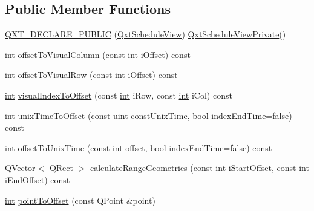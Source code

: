 \subsection*{Public Member Functions}
\begin{DoxyCompactItemize}
\item 
\hyperlink{class_qxt_schedule_view_private_a4fc125cd42cc324eb4a471220a1c36fd}{Q\-X\-T\-\_\-\-D\-E\-C\-L\-A\-R\-E\-\_\-\-P\-U\-B\-L\-I\-C} (\hyperlink{class_qxt_schedule_view}{Qxt\-Schedule\-View}) \hyperlink{class_qxt_schedule_view_private}{Qxt\-Schedule\-View\-Private}()
\item 
\hyperlink{ioapi_8h_a787fa3cf048117ba7123753c1e74fcd6}{int} \hyperlink{class_qxt_schedule_view_private_a1546317491227d0bb70fdc7289caa92f}{offset\-To\-Visual\-Column} (const \hyperlink{ioapi_8h_a787fa3cf048117ba7123753c1e74fcd6}{int} i\-Offset) const 
\item 
\hyperlink{ioapi_8h_a787fa3cf048117ba7123753c1e74fcd6}{int} \hyperlink{class_qxt_schedule_view_private_a52218e6eb072ede576c677b70226007b}{offset\-To\-Visual\-Row} (const \hyperlink{ioapi_8h_a787fa3cf048117ba7123753c1e74fcd6}{int} i\-Offset) const 
\item 
\hyperlink{ioapi_8h_a787fa3cf048117ba7123753c1e74fcd6}{int} \hyperlink{class_qxt_schedule_view_private_ad98a807a53742a6391c78e4d7620c945}{visual\-Index\-To\-Offset} (const \hyperlink{ioapi_8h_a787fa3cf048117ba7123753c1e74fcd6}{int} i\-Row, const \hyperlink{ioapi_8h_a787fa3cf048117ba7123753c1e74fcd6}{int} i\-Col) const 
\item 
\hyperlink{ioapi_8h_a787fa3cf048117ba7123753c1e74fcd6}{int} \hyperlink{class_qxt_schedule_view_private_a88e86740e505eb36ec8a8e9caf40f54f}{unix\-Time\-To\-Offset} (const uint const\-Unix\-Time, bool index\-End\-Time=false) const 
\item 
\hyperlink{ioapi_8h_a787fa3cf048117ba7123753c1e74fcd6}{int} \hyperlink{class_qxt_schedule_view_private_a5793d828e5d20c21f18abfd61a56a2b6}{offset\-To\-Unix\-Time} (const \hyperlink{ioapi_8h_a787fa3cf048117ba7123753c1e74fcd6}{int} \hyperlink{glext_8h_ae1b92ae085ddef4b1cdca7d749339fb0}{offset}, bool index\-End\-Time=false) const 
\item 
Q\-Vector$<$ Q\-Rect $>$ \hyperlink{class_qxt_schedule_view_private_a02f1ddf3b14c2ce316c48a4373dc09d6}{calculate\-Range\-Geometries} (const \hyperlink{ioapi_8h_a787fa3cf048117ba7123753c1e74fcd6}{int} i\-Start\-Offset, const \hyperlink{ioapi_8h_a787fa3cf048117ba7123753c1e74fcd6}{int} i\-End\-Offset) const 
\item 
\hyperlink{ioapi_8h_a787fa3cf048117ba7123753c1e74fcd6}{int} \hyperlink{class_qxt_schedule_view_private_a8b72b48fad4fc0018143626a57bc5179}{point\-To\-Offset} (const Q\-Point \&point)

\end{DoxyCompactItemize}
